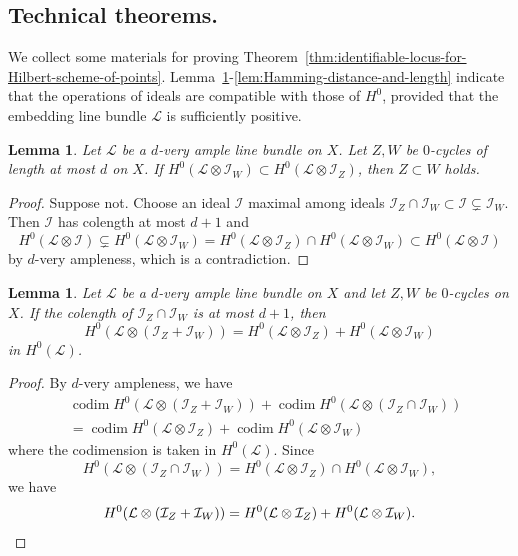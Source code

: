 \documentclass[a4paper]{amsart}
\numberwithin{equation}{section}
\theoremstyle{plain}
\newtheorem{lem}[thm]{Lemma}
\theoremstyle{definition}
\theoremstyle{remark}
\numberwithin{figure}{section}
\numberwithin{table}{section}
\numberwithin{equation}{section}
\def \Ical {\mathcal{I}}
\def \Lcal {\mathcal{L}}
\DeclareMathOperator{\codim}{codim}
\begin{document}
\subsection{Technical theorems.} \label{subsec:Technical-theorems}


We collect some materials for proving Theorem~\ref{thm:identifiable-locus-for-Hilbert-scheme-of-points}.
Lemma~\ref{lem:sections-inclusion-implies-inclusion}-\ref{lem:Hamming-distance-and-length} indicate that the operations of ideals are compatible with those of $H^0$, provided that the embedding line bundle $\Lcal$ is sufficiently positive.

\begin{lem} \label{lem:sections-inclusion-implies-inclusion}
    Let $\Lcal$ be a $d$-very ample line bundle on $X$.
    Let $Z,W$ be $0$-cycles of length at most $d$ on $X$.
    If $H^0(\Lcal \otimes \Ical_W) \subset H^0(\Lcal \otimes \Ical_Z)$, then $Z \subset W$ holds.
\end{lem}

\begin{proof}
    Suppose not.
    Choose an ideal $\Ical$ maximal among ideals $\Ical_Z \cap \Ical_W \subset \Ical \subsetneq \Ical_W$.
    Then $\Ical$ has colength at most $d+1$ and
    \[
        H^0(\Lcal \otimes \Ical)
        \subsetneq H^0(\Lcal \otimes \Ical_W)
        = H^0(\Lcal \otimes \Ical_{Z}) \cap H^0(\Lcal \otimes \Ical_W)
        \subset H^0(\Lcal \otimes \Ical)
    \]
    by $d$-very ampleness, which is a contradiction.
\end{proof}

\begin{lem} \label{lem:sum-of-ideals}
    Let $\Lcal$ be a $d$-very ample line bundle on $X$ and let $Z,W$ be $0$-cycles on $X$.
    If the colength of $\Ical_Z \cap \Ical_W$ is at most $d+1$, then 
     \begin{equation}
        H^0(\Lcal \otimes (\Ical_{Z}+\Ical_{W})) = H^0(\Lcal \otimes \Ical_{Z}) + H^0(\Lcal \otimes \Ical_{W})
     \end{equation}
    in $H^0(\Lcal)$.
\end{lem}

\begin{proof}
    By $d$-very ampleness, we have
     \begin{align*}
      &\codim H^0(\Lcal \otimes (\Ical_Z + \Ical_W)) + \codim H^0(\Lcal \otimes (\Ical_Z \cap \Ical_W)) \\
      &= \codim H^0(\Lcal \otimes \Ical_Z) + \codim H^0(\Lcal \otimes \Ical_W)
     \end{align*}
    where the codimension is taken in $H^0(\Lcal)$.
    Since
     \begin{equation}
      H^0(\Lcal \otimes (\Ical_Z \cap \Ical_W)) = H^0(\Lcal \otimes \Ical_Z) \cap H^0(\Lcal \otimes \Ical_W),
     \end{equation}
    we have
     \[
      H^0(\Lcal \otimes (\Ical_Z + \Ical_W)) = H^0(\Lcal \otimes \Ical_Z) + H^0(\Lcal \otimes \Ical_W). \qedhere
     \]
\end{proof}
\end{document}
